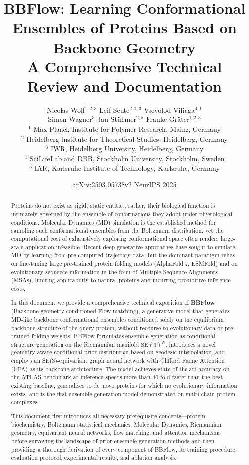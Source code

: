 \documentclass[12pt,a4paper]{article}
\title{\Large\bfseries
  BBFlow: Learning Conformational Ensembles of Proteins Based on Backbone Geometry\\[0.4em]
  \large A Comprehensive Technical Review and Documentation}
\author{
  Nicolas Wolf$^{1,2,3}$ \quad Leif Seute$^{2,1,3}$ \quad Vsevolod Viliuga$^{4,1}$\\
  Simon Wagner$^3$ \quad Jan Stühmer$^{2,5}$ \quad Frauke Gräter$^{1,2,3}$\\[0.6em]
  \small $^1$ Max Planck Institute for Polymer Research, Mainz, Germany\\
  \small $^2$ Heidelberg Institute for Theoretical Studies, Heidelberg, Germany\\
  \small $^3$ IWR, Heidelberg University, Heidelberg, Germany\\
  \small $^4$ SciLifeLab and DBB, Stockholm University, Stockholm, Sweden\\
  \small $^5$ IAR, Karlsruhe Institute of Technology, Karlsruhe, Germany
}
\date{arXiv:2503.05738v2 \quad NeurIPS 2025}
\newcommand{\SE}{\mathrm{SE}(3)}
\begin{document}
\maketitle
\thispagestyle{empty}

\begin{abstract}
\noindent
Proteins do not exist as rigid, static entities; rather, their biological function is intimately governed
by the ensemble of conformations they adopt under physiological conditions. Molecular Dynamics
(MD) simulation is the established method for sampling such conformational ensembles from the
Boltzmann distribution, yet the computational cost of exhaustively exploring conformational space
often renders large-scale application infeasible. Recent deep generative approaches have sought to
emulate MD by learning from pre-computed trajectory data, but the dominant paradigm relies on
fine-tuning large pre-trained protein folding models (AlphaFold 2, ESMFold) and on evolutionary
sequence information in the form of Multiple Sequence Alignments (MSAs), limiting applicability
to natural proteins and incurring prohibitive inference costs.

In this document we provide a comprehensive technical exposition of \textbf{BBFlow}
(Backbone-geometry-conditioned Flow matching), a generative model that generates
MD-like backbone conformational ensembles conditioned solely on the equilibrium backbone
structure of the query protein, without recourse to evolutionary data or pre-trained folding weights.
BBFlow formulates ensemble generation as conditional structure generation on the Riemannian manifold
$\SE^N$, introduces a novel geometry-aware conditional prior distribution based on geodesic interpolation,
and employs an SE(3)-equivariant graph neural network with Clifford Frame Attention (CFA) as its
backbone architecture.  The model achieves state-of-the-art accuracy on the ATLAS benchmark at
inference speeds more than 40-fold faster than the best existing baseline, generalises to de~novo
proteins for which no evolutionary information exists, and is the first ensemble generation model
demonstrated on multi-chain protein complexes.

This document first introduces all necessary prerequisite concepts---protein biochemistry, Boltzmann
statistical mechanics, Molecular Dynamics, Riemannian geometry, equivariant neural networks, flow
matching, and attention mechanisms---before surveying the landscape of prior ensemble generation
methods and then providing a thorough derivation of every component of BBFlow, its training
procedure, evaluation protocol, experimental results, and ablation analysis.
\end{abstract}
\end{document}
